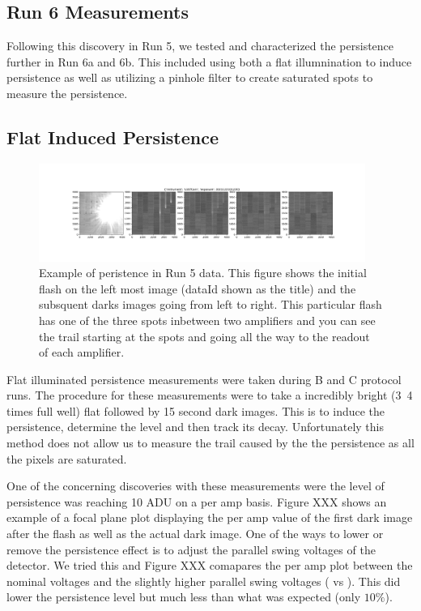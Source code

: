 \documentclass[DM,authoryear,toc]{lsstdoc}
\begin{document}
\subsection[]{Run 6 Measurements}
Following this discovery in Run 5, we tested and characterized the persistence further in Run 6a and 6b. 
This included using both a flat illumnination to induce persistence as well as utilizing a pinhole filter to create saturated spots to measure the persistence.

\subsection[]{Flat Induced Persistence}
\begin{figure}[!htp]
  \centering
  \includegraphics[width=0.95\textwidth, angle=0]{Run_5_persistence_ex.png}
  \caption{
  Example of peristence in Run 5 data. 
  This figure shows the initial flash on the left most image (dataId shown as the title) and the subsquent darks images going from left to right.
  This particular flash has one of the three spots inbetween two amplifiers and you can see the trail starting at the spots and going all the way to the readout of each amplifier.
  }\label{fig:ex_persistence_Run5}
\end{figure}

Flat illuminated persistence measurements were taken during B and C protocol runs.
The procedure for these measurements were to take a incredibly bright (3~4 times full well) flat followed by 15 second dark images.
This is to induce the persistence, determine the level and then track its decay.
Unfortunately this method does not allow us to measure the trail caused by the the persistence as all the pixels are saturated.


One of the concerning discoveries with these measurements were the level of persistence was reaching 10 ADU on a per amp basis.
Figure XXX shows an example of a focal plane plot displaying the per amp value of the first dark image after the flash as well as the actual dark image.
One of the ways to lower or remove the persistence effect is to adjust the parallel swing voltages of the detector.
We tried this and Figure XXX comapares the per amp plot between the nominal voltages and the slightly higher parallel swing voltages ( vs ).
This did lower the persistence level but much less than what was expected (only $10\%$).
\end{document}
